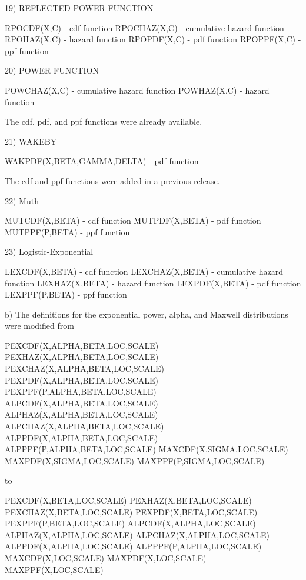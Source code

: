 {       19) REFLECTED POWER FUNCTION
 
           RPOCDF(X,C)                   - cdf function
           RPOCHAZ(X,C)                  - cumulative hazard function
           RPOHAZ(X,C)                   - hazard function
           RPOPDF(X,C)                   - pdf function
           RPOPPF(X,C)                   - ppf function

       20) POWER FUNCTION
 
           POWCHAZ(X,C)                  - cumulative hazard function
           POWHAZ(X,C)                   - hazard function

           The cdf, pdf, and ppf functions were already
           available.

       21) WAKEBY
 
           WAKPDF(X,BETA,GAMMA,DELTA)    - pdf function

           The cdf and ppf functions were added in a
           previous release.

       22) Muth
 
           MUTCDF(X,BETA)                - cdf function
           MUTPDF(X,BETA)                - pdf function
           MUTPPF(P,BETA)                - ppf function
 
       23) Logistic-Exponential
 
           LEXCDF(X,BETA)                - cdf function
           LEXCHAZ(X,BETA)               - cumulative hazard function
           LEXHAZ(X,BETA)                - hazard function
           LEXPDF(X,BETA)                - pdf function
           LEXPPF(P,BETA)                - ppf function
 
    b) The definitions for the exponential power, alpha, and
       Maxwell distributions were modified from

           PEXCDF(X,ALPHA,BETA,LOC,SCALE)
           PEXHAZ(X,ALPHA,BETA,LOC,SCALE)
           PEXCHAZ(X,ALPHA,BETA,LOC,SCALE)
           PEXPDF(X,ALPHA,BETA,LOC,SCALE)
           PEXPPF(P,ALPHA,BETA,LOC,SCALE)
           ALPCDF(X,ALPHA,BETA,LOC,SCALE)
           ALPHAZ(X,ALPHA,BETA,LOC,SCALE)
           ALPCHAZ(X,ALPHA,BETA,LOC,SCALE)
           ALPPDF(X,ALPHA,BETA,LOC,SCALE)
           ALPPPF(P,ALPHA,BETA,LOC,SCALE)
           MAXCDF(X,SIGMA,LOC,SCALE)
           MAXPDF(X,SIGMA,LOC,SCALE)
           MAXPPF(P,SIGMA,LOC,SCALE)

       to

           PEXCDF(X,BETA,LOC,SCALE)
           PEXHAZ(X,BETA,LOC,SCALE)
           PEXCHAZ(X,BETA,LOC,SCALE)
           PEXPDF(X,BETA,LOC,SCALE)
           PEXPPF(P,BETA,LOC,SCALE)
           ALPCDF(X,ALPHA,LOC,SCALE)
           ALPHAZ(X,ALPHA,LOC,SCALE)
           ALPCHAZ(X,ALPHA,LOC,SCALE)
           ALPPDF(X,ALPHA,LOC,SCALE)
           ALPPPF(P,ALPHA,LOC,SCALE)
           MAXCDF(X,LOC,SCALE)
           MAXPDF(X,LOC,SCALE)
           MAXPPF(X,LOC,SCALE)

}
